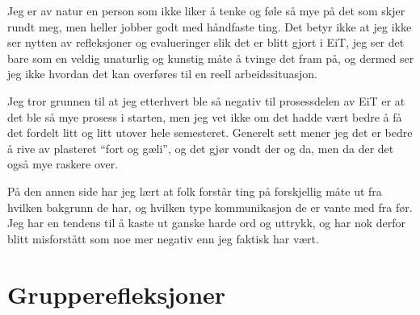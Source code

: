 Jeg er av natur en person som ikke liker å tenke og føle så mye på det som skjer 
rundt meg, men heller jobber godt med håndfaste ting. Det betyr ikke at jeg ikke ser 
nytten av refleksjoner og evalueringer slik det er blitt gjort i EiT, jeg ser det 
bare som en veldig unaturlig og kunstig måte å tvinge det fram på, og dermed ser 
jeg ikke hvordan det kan overføres til en reell arbeidssituasjon.

Jeg tror grunnen til at jeg etterhvert ble så negativ til prosessdelen av EiT 
er at det ble så mye prosess i starten, men jeg vet ikke om det hadde vært bedre å få 
det fordelt litt og litt utover hele semesteret. Generelt sett mener jeg det er 
bedre å rive av plasteret ``fort og gæli'', og det gjør vondt der og da, men 
da der det også mye raskere over. 

På den annen side har jeg lært at folk forstår ting på forskjellig måte ut fra 
hvilken bakgrunn de har, og hvilken type kommunikasjon de er vante med fra før.
Jeg har en tendens til å kaste ut ganske harde ord og uttrykk, og har nok 
derfor blitt misforstått som noe mer negativ enn jeg faktisk har vært. 


\section{Grupperefleksjoner}